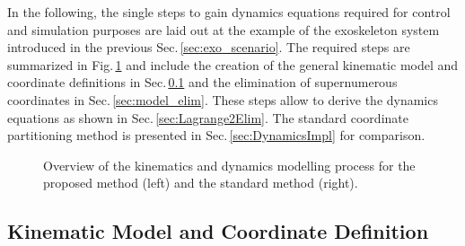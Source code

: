 \documentclass[twocolumn,10pt]{IFTOMM}
\begin{document}
In the following, the single steps to gain dynamics equations required for control and simulation purposes are laid out at the example of the exoskeleton system introduced in the previous Sec.\,\ref{sec:exo_scenario}.
The required steps are summarized in Fig.\,\ref{fig:flowchart_overview} and include the creation of the general kinematic model and coordinate definitions in Sec.\,\ref{sec:model_fullcoord} and the elimination of supernumerous coordinates in Sec.\,\ref{sec:model_elim}.
These steps allow to derive the dynamics equations as shown in Sec.\,\ref{sec:Lagrange2Elim}.
The standard coordinate partitioning method is presented in Sec.\,\ref{sec:DynamicsImpl} for comparison.

\begin{figure}[tb!]
    
    \caption{Overview of the kinematics and dynamics modelling process for the proposed method (left) and the standard method (right).}
    \label{fig:flowchart_overview}
\end{figure} 


\subsection{Kinematic Model and Coordinate Definition}
\label{sec:model_fullcoord}
\end{document}
